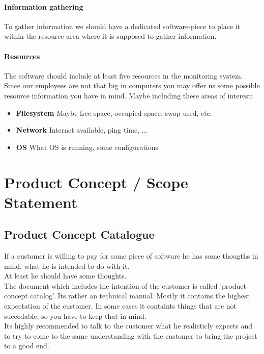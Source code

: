 \documentclass[11pt]{article}
\begin{document}
\paragraph{Information gathering}
To gather information we should have a dedicated software-piece to place it
within the resource-area where it is supposed to gather information.
\paragraph{Resources}
The software should include at least five resources in the monitoring system.
Since our employees are not that big in computers you may offer us some possible
resource information you have in mind. Maybe including these areas of interest:
\begin{itemize}
    \item \textbf{Filesystem} Maybe free space, occupied space, swap used, etc.
    \item \textbf{Network} Internet available, ping time, ...
    \item \textbf{OS} What OS is running, some configurations
\end{itemize}

\section{Product Concept / Scope Statement}
\subsection{Product Concept Catalogue}
If a customer is willing to pay for some piece of software he has some thougths in mind,
what he is intended to do with it.\\
At least he should have some thoughts.\\
The document which includes the intention of the customer is called 'product concept catalog'. Its rather an technical manual.
Mostly it contains the highest expectation of the customer. In some cases it containts things that are not succedable, so you have to keep that in mind. \\
Its highly recommended to talk to the customer what he realisticly expects and to try to come to the same understanding with the customer to bring the project to a good end.
\end{document}

